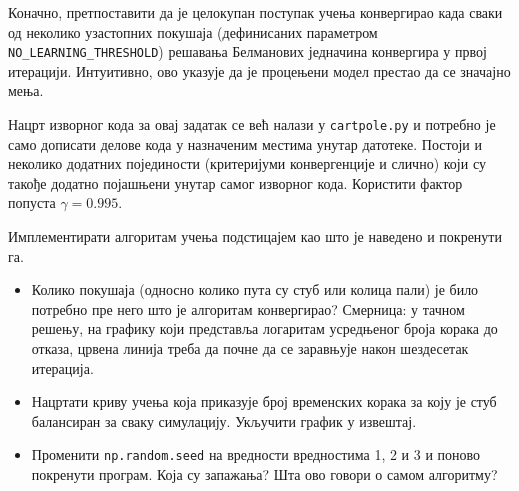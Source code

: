 Коначно, претпоставити да је целокупан поступак учења конвергирао када сваки од неколико узастопних покушаја (дефинисаних параметром {\tt NO\_LEARNING\_THRESHOLD}) решавања Белманових једначина конвергира у првој итерацији. Интуитивно, ово указује да је процењени модел престао да се значајно мења.

Нацрт изворног кода за овај задатак се већ налази у {\tt cartpole.py} и потребно је само дописати делове кода у назначеним местима унутар датотеке. Постоји и неколико додатних појединости (критеријуми конвергенције и слично) који су такође додатно појашњени унутар самог изворног кода. Користити фактор попуста $\gamma = 0.995$.

Имплементирати алгоритам учења подстицајем као што је наведено и покренути га.

\begin{itemize}
\item Колико покушаја (односно колико пута су стуб или колица пали) је било потребно пре него што је алгоритам конвергирао? Смерница: у тачном решењу, на графику који представља логаритам усредњеног броја корака до отказа, црвена линија треба да почне да се заравњује након шездесетак итерација.

\item Нацртати криву учења која приказује број временских корака за коју је стуб балансиран за сваку симулацију. Укључити график у извештај.
  
\item Променити {\tt np.random.seed} на вредности вредностима 1, 2 и 3 и поново покренути програм. Која су запажања? Шта ово говори о самом алгоритму?
\end{itemize}

\ifnum{} {
  
} \fi
